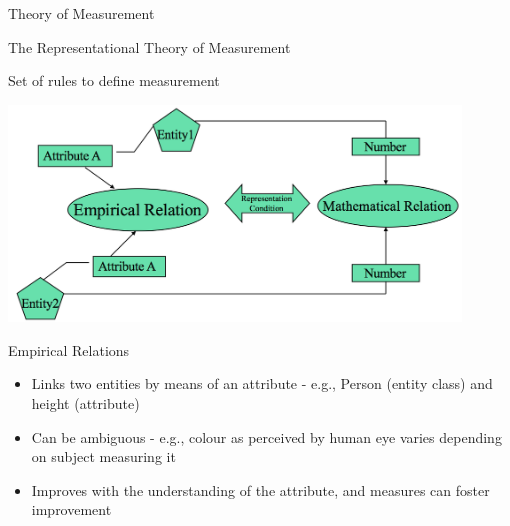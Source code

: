 \documentclass{beamer}
\begin{document}
\begin{frame}{\centerline{}}


\begin{center}
{\Large
Theory of Measurement
}
\end{center}

\end{frame}



\begin{frame}{\centerline{The Representational Theory of Measurement}}

Set of rules to define measurement

\begin{center}
\includegraphics[width=120mm]{A2022.IDSEPC.SperimentazioneDeduzione/img-img07.png}
\end{center}
\end{frame}

\begin{frame}{\centerline{Empirical Relations}}


\begin{itemize}
\item  Links two entities by means of an attribute - e.g., Person (entity class) and height (attribute)
\item  Can be ambiguous - e.g., colour as perceived by human eye varies depending on subject measuring it
\item  Improves with the understanding of the attribute, and measures can foster improvement

\end{itemize}

\end{frame}
\end{document}
